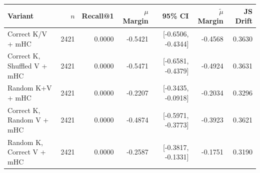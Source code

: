 \begin{tabular}{l r r r r r r}
\toprule
Variant & $n$ & Recall@1 & $\mu$ Margin & 95\% CI & $\tilde{\mu}$ Margin & JS Drift \\
\midrule
Correct K/V + mHC & 2421 & 0.0000 & -0.5421 & [-0.6506, -0.4344] & -0.4568 & 0.3630 \\
Correct K, Shuffled V + mHC & 2421 & 0.0000 & -0.5471 & [-0.6581, -0.4379] & -0.4924 & 0.3631 \\
Random K+V + mHC & 2421 & 0.0000 & -0.2207 & [-0.3435, -0.0918] & -0.2034 & 0.3296 \\
Correct K, Random V + mHC & 2421 & 0.0000 & -0.4874 & [-0.5971, -0.3773] & -0.3923 & 0.3621 \\
Random K, Correct V + mHC & 2421 & 0.0000 & -0.2587 & [-0.3817, -0.1331] & -0.1751 & 0.3190 \\
\bottomrule
\end{tabular}
